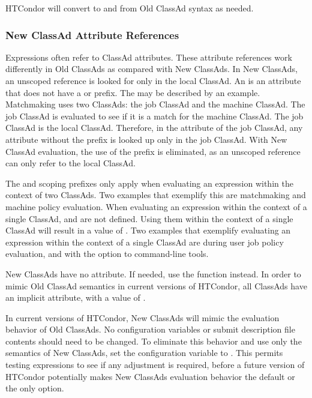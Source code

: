 HTCondor will convert to and from Old ClassAd syntax as needed.

\subsubsection{New ClassAd Attribute References}

Expressions often refer to ClassAd attributes.
These attribute references work differently in Old ClassAds as compared
with New ClassAds.
In New ClassAds, 
an unscoped reference is looked for only in the local ClassAd. 
An  is an attribute that does not have a
 or  prefix.
The  may be described by an example.
Matchmaking uses two ClassAds: the job ClassAd and the machine ClassAd. 
The job ClassAd is evaluated to see if it is a match for the machine ClassAd.
The job ClassAd is the local ClassAd.
Therefore, in the  attribute of the job ClassAd,
any attribute without the prefix  is looked up only
in the job ClassAd.
With New ClassAd evaluation, the use of the prefix  is eliminated,
as an unscoped reference can only refer to the local ClassAd.

The  and  scoping prefixes
only apply when evaluating an expression within the context of two ClassAds.
Two examples that exemplify this are matchmaking and machine policy evaluation.
When evaluating an expression within the context of a single ClassAd,
 and  are not defined.
Using them within the context of a single ClassAd will result
in a value of .
Two examples that exemplify evaluating an expression 
within the context of a single ClassAd are 
during user job policy evaluation,
and with the  option to command-line tools.

New ClassAds have no  attribute.
If needed, use the  function instead.
In order to mimic Old ClassAd semantics in current versions of HTCondor,
all ClassAds have an implicit  attribute,
with a value of .

In current versions of HTCondor, 
New ClassAds will mimic the evaluation behavior of Old ClassAds.
No configuration variables or submit description file contents should
need to be changed.
To eliminate this behavior and use only the semantics of New ClassAds, 
set the configuration variable
 to .
This permits testing expressions to see if any adjustment is required,
before a future version of HTCondor potentially makes New ClassAds
evaluation behavior the default or the only option. 

